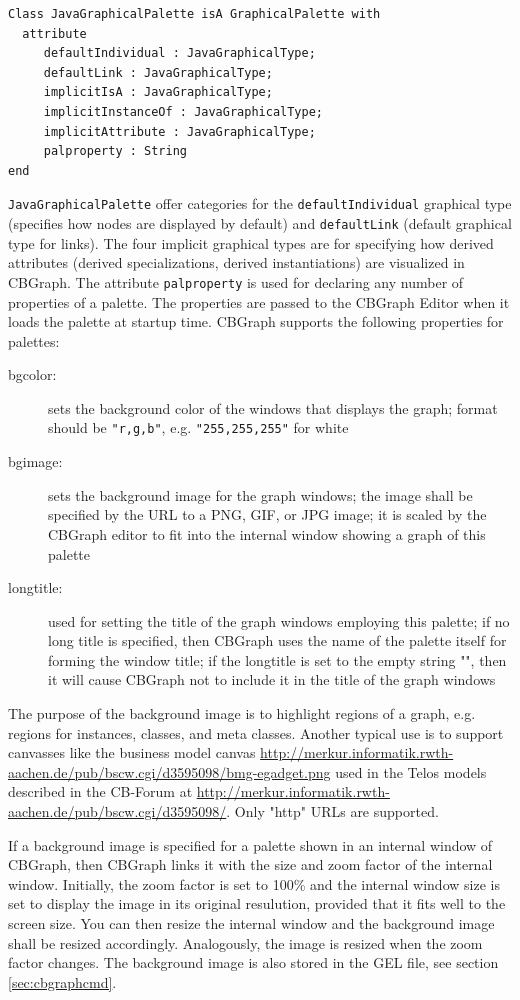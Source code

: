 {\small
\begin{verbatim}
Class JavaGraphicalPalette isA GraphicalPalette with
  attribute
     defaultIndividual : JavaGraphicalType;
     defaultLink : JavaGraphicalType;
     implicitIsA : JavaGraphicalType;
     implicitInstanceOf : JavaGraphicalType;
     implicitAttribute : JavaGraphicalType;
     palproperty : String
end
\end{verbatim}
}

{\tt JavaGraphicalPalette} offer categories for the {\tt defaultIndividual}
graphical type (specifies how nodes are displayed by default) and
{\tt defaultLink} (default graphical type for links).
The four implicit graphical types are for specifying how derived attributes (derived
specializations, derived instantiations) are visualized in CBGraph.
The attribute {\tt palproperty} is used for declaring any number of properties
of a palette. The properties are passed to the CBGraph Editor when it loads
the palette at startup time. CBGraph supports the following properties for palettes:

\begin{description}
\item[bgcolor:] sets the background color of the windows that displays the graph;
  format should be {\tt "r,g,b"}, e.g. {\tt "255,255,255"} for white
\item[bgimage:] sets the background image for the graph windows; the image shall
  be specified by the URL to a PNG, GIF, or JPG image;
  it is scaled by the CBGraph editor to fit into the internal window showing a graph of this palette
\item[longtitle:] used for setting the title of the graph windows employing this palette;
  if no long title is specified, then CBGraph uses the name of the palette itself for
  forming the window title; if the longtitle is set to the empty string "", then
  it will cause CBGraph not to include it in the title of the graph windows
\end{description}

The purpose of the background image is to highlight regions of a graph, e.g. regions for
instances, classes, and meta classes. Another typical use is to support canvasses
like the business model canvas
\url{http://merkur.informatik.rwth-aachen.de/pub/bscw.cgi/d3595098/bmg-egadget.png} used
in the Telos models described in the CB-Forum at
\url{http://merkur.informatik.rwth-aachen.de/pub/bscw.cgi/d3595098/}.
Only "http" URLs are supported.

If a background image is specified for a palette shown in an internal window of CBGraph,
then CBGraph links it with the size and zoom factor of the internal window. Initially, the
zoom factor is set to 100\% and the internal window size is set to display the image
in its original resulution, provided that it fits well to the screen size.
You can then resize the internal window and the background image shall be resized
accordingly. Analogously, the image is resized when the zoom factor changes.
The background image is also stored in the GEL file, see section \ref{sec:cbgraphcmd}.


